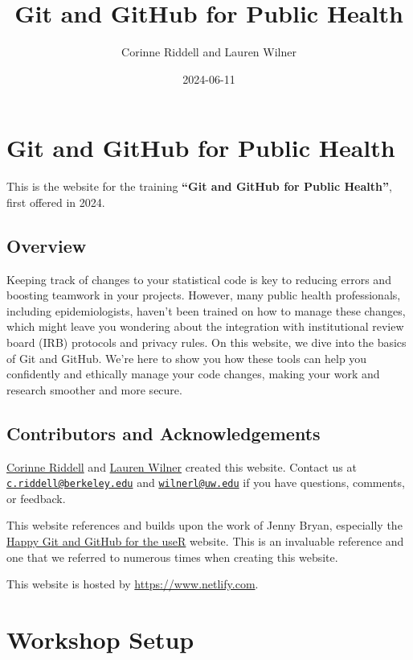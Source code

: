 \documentclass[
]{book}
\title{Git and GitHub for Public Health}
\author{Corinne Riddell and Lauren Wilner}
\date{2024-06-11}
\begin{document}
\maketitle

{
\setcounter{tocdepth}{1}
\tableofcontents
}
\chapter{Git and GitHub for Public Health}\label{git-and-github-for-public-health}

This is the website for the training \textbf{``Git and GitHub for Public Health''},
first offered in 2024.

\section{Overview}\label{overview}

Keeping track of changes to your statistical code is key to reducing errors and boosting teamwork in your projects. However, many public health professionals, including epidemiologists, haven't been trained on how to manage these changes, which might leave you wondering about the integration with institutional review board (IRB) protocols and privacy rules. On this website, we dive into the basics of Git and GitHub. We're here to show you how these tools can help you confidently and ethically manage your code changes, making your work and research smoother and more secure.

\section{Contributors and Acknowledgements}\label{contributors-and-acknowledgements}

\href{https://corinne-riddell.github.io/}{Corinne Riddell} and \href{laurenwilner.github.io}{Lauren Wilner}
created this website. Contact us at \href{mailto:c.riddell@berkeley.edu}{\nolinkurl{c.riddell@berkeley.edu}} and \href{mailto:wilnerl@uw.edu}{\nolinkurl{wilnerl@uw.edu}} if
you have questions, comments, or feedback.

This website references and builds upon the work of Jenny Bryan, especially the
\href{https://happygitwithr.com/}{Happy Git and GitHub for the useR} website. This is
an invaluable reference and one that we referred to numerous times when creating
this website.

This website is hosted by \url{https://www.netlify.com}.

\chapter{Workshop Setup}\label{workshop-setup}
\end{document}
